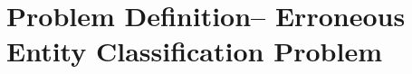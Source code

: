 \vspace{-1ex}
\section{Problem Definition--  Erroneous Entity Classification Problem}
\label{sec-def2}





